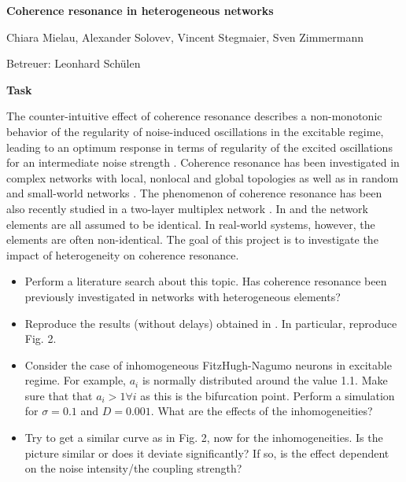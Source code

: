 \thispagestyle{empty}

\begin{center}

\rule{0mm}{3cm}

\textbf{\LARGE Coherence resonance in heterogeneous networks}

\vspace{4mm}

Chiara Mielau, Alexander Solovev, Vincent Stegmaier, Sven Zimmermann

\vspace{2mm}

Betreuer: Leonhard Schülen

\vspace{4cm}

\begin{minipage}[c]{0.7\textwidth}
	\begin{center}
		\textbf{\large Task}
	\end{center}
	The counter-intuitive effect of coherence resonance describes a non-monotonic behavior of the
	regularity of noise-induced oscillations in the excitable regime, leading to an optimum response
	in terms of regularity of the excited oscillations for an intermediate noise strength \cite{Pikovsky1997}. Coherence
	resonance has been investigated in complex networks with local, nonlocal and global topologies as
	well as in random and small-world networks \cite{Masoliver2017}. The phenomenon of coherence resonance has been
	also recently studied in a two-layer multiplex network \cite{Semenova2018}. In \cite{Masoliver2017} and \cite{Semenova2018} the network elements are
	all assumed to be identical. In real-world systems, however, the elements are often non-identical.
	The goal of this project is to investigate the impact of heterogeneity on coherence resonance.
	
	\begin{itemize}
		\item Perform a literature search about this topic. Has coherence resonance been previously investigated in networks with heterogeneous elements?
		\item Reproduce the results (without delays) obtained in \cite{Masoliver2017}. In particular, reproduce Fig. 2.
		\item Consider the case of inhomogeneous FitzHugh-Nagumo neurons in excitable regime. For example, $a_i$ is normally distributed around the value 1.1. 
			Make sure that that $a_i > 1 \forall i$ as this is the bifurcation point. Perform a simulation for $\sigma = 0.1$ and $D = 0.001$. What are the effects of the inhomogeneities?
		\item  Try to get a similar curve as in Fig. 2, now for the inhomogeneities. Is the picture similar or does it deviate significantly?
			 If so, is the effect dependent on the noise intensity/the coupling strength?
	\end{itemize}
\end{minipage}

\end{center}

\newpage

\tableofcontents
\thispagestyle{empty}

\setcounter{page}{0}